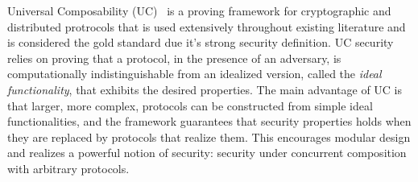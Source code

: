 
Universal Composability (UC)~\cite{canettiUC} is a proving framework for cryptographic and distributed protrocols that %
is used extensively throughout existing literature and is considered the gold standard due it's strong security definition.
UC security relies on proving that a protocol, in the presence of an adversary, is computationally indistinguishable from an idealized version, called the \emph{ideal functionality}, that exhibits the desired properties.
The main advantage of UC is that larger, more complex, protocols can be constructed from simple ideal functionalities, and the framework guarantees that security properties holds when 
they are replaced by protocols that realize them.
This encourages modular design and realizes a powerful notion of security: security under concurrent composition with arbitrary protocols.

